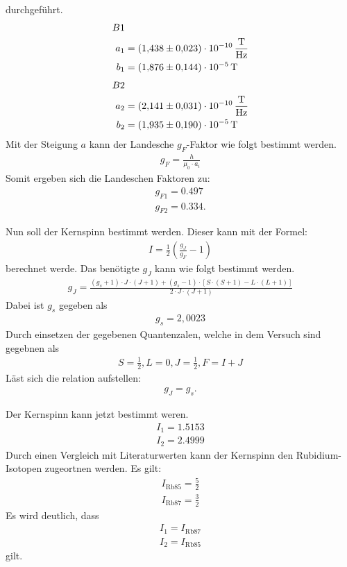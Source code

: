 durchgeführt.
\begin{align*}
  B1&\\
  a_1&=\SI{1.438\pm 0.023e-10}{\frac{T}{Hz}}\\
  b_1&=\SI{1.876\pm 0.144e-5}{T}
\end{align*}
\begin{align*}
  B2&\\
  a_2&=\SI{2.141\pm0.031e-10}{\frac{T}{Hz}}\\
  b_2&=\SI{1.935\pm0.190e-5}{T}
\end{align*}
\FloatBarrier
Mit der Steigung $a$ kann der Landesche $g_F$-Faktor wie folgt bestimmt werden.
\begin{align*}
  g_F = \frac{h}{\mu_0\cdot a_i}
\end{align*}
Somit ergeben sich die Landeschen Faktoren zu:
\begin{align*}
  g_{F1} = 0.497\\
  g_{F2} = 0.334.
\end{align*}

Nun soll der Kernspinn bestimmt werden.
Dieser kann mit der Formel:
\begin{align*}
  I = \frac{1}{2}\left(\frac{g_J}{g_F}-1\right)
\end{align*}
berechnet werde.
Das benötigte $g_J$ kann wie folgt bestimmt werden.
\begin{align*}
  g_J = \frac{(g_s+1)\cdot J\cdot(J+1)+(g_s-1)\cdot[S\cdot (S+1)-L\cdot (L+1)]}{2\cdot J \cdot (J+1)}
\end{align*}
Dabei ist $g_s$ gegeben als
\begin{align*}
  g_s = 2,0023
\end{align*}
Durch einsetzen der gegebenen Quantenzalen, welche in dem Versuch sind gegebnen als
\begin{align*}
  S = \frac{1}{2}, L=0, J=\frac{1}{2}, F = I+J
\end{align*}
Läst sich die relation aufstellen:
\begin{align*}
  g_J=g_s.
\end{align*}

Der Kernspinn kann jetzt bestimmt weren.
\begin{align*}
  I_1=1.5153\\
  I_2=2.4999
\end{align*}
Durch einen Vergleich mit Literaturwerten kann der Kernspinn den Rubidium-Isotopen zugeortnen werden.
Es gilt:
\begin{align*}
  I_{\text{Rb85}}=\frac{5}{2}\\
  I_{\text{Rb87}}=\frac{3}{2}
\end{align*}
Es wird deutlich, dass
\begin{align*}
  I_1=I_{\text{Rb87}}\\
  I_2=I_{\text{Rb85}}
\end{align*}
gilt.
